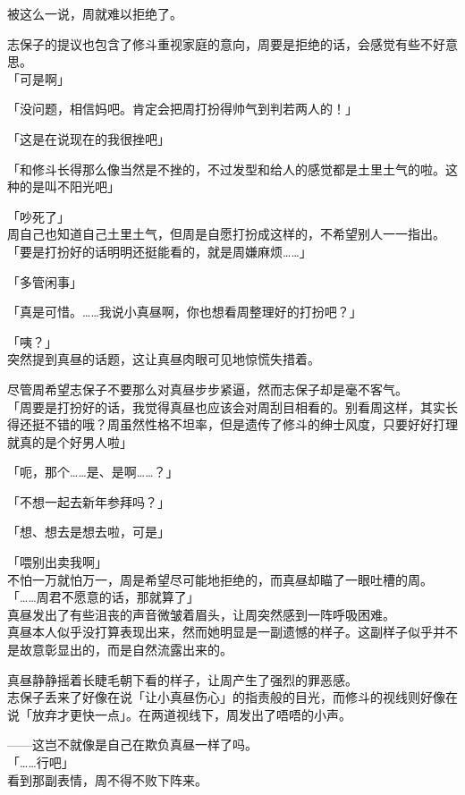 被这么一说，周就难以拒绝了。

志保子的提议也包含了修斗重视家庭的意向，周要是拒绝的话，会感觉有些不好意思。\\

「可是啊」

「没问题，相信妈吧。肯定会把周打扮得帅气到判若两人的！」

「这是在说现在的我很挫吧」

「和修斗长得那么像当然是不挫的，不过发型和给人的感觉都是土里土气的啦。这种的是叫不阳光吧」

「吵死了」\\

周自己也知道自己土里土气，但周是自愿打扮成这样的，不希望别人一一指出。\\

「要是打扮好的话明明还挺能看的，就是周嫌麻烦……」

「多管闲事」

「真是可惜。……我说小真昼啊，你也想看周整理好的打扮吧？」

「咦？」\\

突然提到真昼的话题，这让真昼肉眼可见地惊慌失措着。

尽管周希望志保子不要那么对真昼步步紧逼，然而志保子却是毫不客气。\\

「周要是打扮好的话，我觉得真昼也应该会对周刮目相看的。别看周这样，其实长得还挺不错的哦？周虽然性格不坦率，但是遗传了修斗的绅士风度，只要好好打理就真的是个好男人啦」

「呃，那个……是、是啊……？」

「不想一起去新年参拜吗？」

「想、想去是想去啦，可是」

「喂别出卖我啊」\\

不怕一万就怕万一，周是希望尽可能地拒绝的，而真昼却瞄了一眼吐槽的周。\\

「……周君不愿意的话，那就算了」\\

真昼发出了有些沮丧的声音微皱着眉头，让周突然感到一阵呼吸困难。\\

真昼本人似乎没打算表现出来，然而她明显是一副遗憾的样子。这副样子似乎并不是故意彰显出的，而是自然流露出来的。

真昼静静摇着长睫毛朝下看的样子，让周产生了强烈的罪恶感。\\

志保子丢来了好像在说「让小真昼伤心」的指责般的目光，而修斗的视线则好像在说「放弃才更快一点」。在两道视线下，周发出了唔唔的小声。

——这岂不就像是自己在欺负真昼一样了吗。\\

「……行吧」\\

看到那副表情，周不得不败下阵来。
